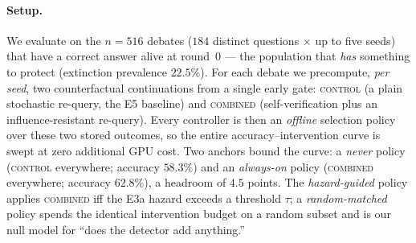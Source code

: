 \paragraph{Setup.}
We evaluate on the $n=516$ debates ($184$ distinct questions $\times$ up to five seeds)
that have a correct answer alive at round~0 --- the population that \emph{has} something
to protect (extinction prevalence $22.5\%$). For each debate we precompute, \emph{per
seed}, two counterfactual continuations from a single early gate: \textsc{control} (a
plain stochastic re-query, the E5 baseline) and \textsc{combined} (self-verification
plus an influence-resistant re-query). Every controller is then an \emph{offline}
selection policy over these two stored outcomes, so the entire accuracy--intervention
curve is swept at zero additional GPU cost. Two anchors bound the curve: a \emph{never}
policy (\textsc{control} everywhere; accuracy $58.3\%$) and an \emph{always-on} policy
(\textsc{combined} everywhere; accuracy $62.8\%$), a headroom of $4.5$ points. The
\emph{hazard-guided} policy
applies \textsc{combined} iff the E3a hazard exceeds a threshold $\tau$; a
\emph{random-matched} policy spends the identical intervention budget on a random
subset and is our null model for ``does the detector add anything.''

